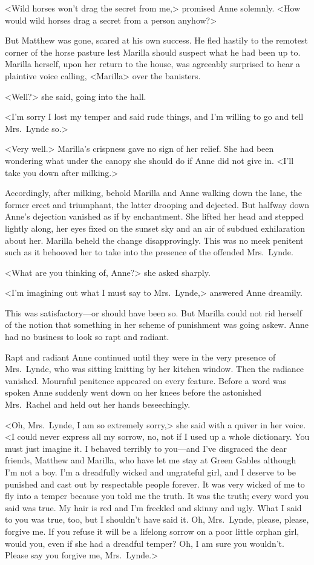 <Wild horses won't drag the secret from me,> promised Anne solemnly. <How would wild horses drag a secret from a person anyhow?>

But Matthew was gone, scared at his own success. He fled hastily to the remotest corner of the horse pasture lest Marilla should suspect what he had been up to. Marilla herself, upon her return to the house, was agreeably surprised to hear a plaintive voice calling, <Marilla> over the banisters.

<Well?> she said, going into the hall.

<I'm sorry I lost my temper and said rude things, and I'm willing to go and tell Mrs.~Lynde so.>

<Very well.> Marilla's crispness gave no sign of her relief. She had been wondering what under the canopy she should do if Anne did not give in. <I'll take you down after milking.>

Accordingly, after milking, behold Marilla and Anne walking down the lane, the former erect and triumphant, the latter drooping and dejected. But halfway down Anne's dejection vanished as if by enchantment. She lifted her head and stepped lightly along, her eyes fixed on the sunset sky and an air of subdued exhilaration about her. Marilla beheld the change disapprovingly. This was no meek penitent such as it behooved her to take into the presence of the offended Mrs.~Lynde.

<What are you thinking of, Anne?> she asked sharply.

<I'm imagining out what I must say to Mrs.~Lynde,> answered Anne dreamily.

This was satisfactory—or should have been so. But Marilla could not rid herself of the notion that something in her scheme of punishment was going askew. Anne had no business to look so rapt and radiant.

Rapt and radiant Anne continued until they were in the very presence of Mrs.~Lynde, who was sitting knitting by her kitchen window. Then the radiance vanished. Mournful penitence appeared on every feature. Before a word was spoken Anne suddenly went down on her knees before the astonished Mrs.~Rachel and held out her hands beseechingly.

<Oh, Mrs.~Lynde, I am so extremely sorry,> she said with a quiver in her voice. <I could never express all my sorrow, no, not if I used up a whole dictionary. You must just imagine it. I behaved terribly to you—and I've disgraced the dear friends, Matthew and Marilla, who have let me stay at Green Gables although I'm not a boy. I'm a dreadfully wicked and ungrateful girl, and I deserve to be punished and cast out by respectable people forever. It was very wicked of me to fly into a temper because you told me the truth. It was the truth; every word you said was true. My hair is red and I'm freckled and skinny and ugly. What I said to you was true, too, but I shouldn't have said it. Oh, Mrs.~Lynde, please, please, forgive me. If you refuse it will be a lifelong sorrow on a poor little orphan girl, would you, even if she had a dreadful temper? Oh, I am sure you wouldn't. Please say you forgive me, Mrs.~Lynde.>

